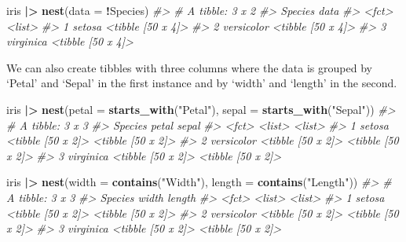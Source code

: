 \documentclass[
]{book}
\newenvironment{Shaded}{\begin{snugshade}}{\end{snugshade}}
\newcommand{\AttributeTok}[1]{\textcolor[rgb]{0.13,0.29,0.53}{#1}}
\newcommand{\CommentTok}[1]{\textcolor[rgb]{0.56,0.35,0.01}{\textit{#1}}}
\newcommand{\FunctionTok}[1]{\textcolor[rgb]{0.13,0.29,0.53}{\textbf{#1}}}
\newcommand{\NormalTok}[1]{#1}
\newcommand{\SpecialCharTok}[1]{\textcolor[rgb]{0.81,0.36,0.00}{\textbf{#1}}}
\newcommand{\StringTok}[1]{\textcolor[rgb]{0.31,0.60,0.02}{#1}}
\begin{document}
\begin{Shaded}
\begin{Highlighting}[]
\NormalTok{iris }\SpecialCharTok{|\textgreater{}} \FunctionTok{nest}\NormalTok{(}\AttributeTok{data =} \SpecialCharTok{!}\NormalTok{Species)}
\CommentTok{\#\textgreater{} \# A tibble: 3 x 2}
\CommentTok{\#\textgreater{}   Species    data             }
\CommentTok{\#\textgreater{}   \textless{}fct\textgreater{}      \textless{}list\textgreater{}           }
\CommentTok{\#\textgreater{} 1 setosa     \textless{}tibble [50 x 4]\textgreater{}}
\CommentTok{\#\textgreater{} 2 versicolor \textless{}tibble [50 x 4]\textgreater{}}
\CommentTok{\#\textgreater{} 3 virginica  \textless{}tibble [50 x 4]\textgreater{}}
\end{Highlighting}
\end{Shaded}

We can also create tibbles with three columns where the data is grouped by `Petal' and `Sepal' in the first instance and by `width' and `length' in the second.

\begin{Shaded}
\begin{Highlighting}[]
\NormalTok{iris }\SpecialCharTok{|\textgreater{}} \FunctionTok{nest}\NormalTok{(}\AttributeTok{petal =} \FunctionTok{starts\_with}\NormalTok{(}\StringTok{"Petal"}\NormalTok{), }\AttributeTok{sepal =} \FunctionTok{starts\_with}\NormalTok{(}\StringTok{"Sepal"}\NormalTok{))}
\CommentTok{\#\textgreater{} \# A tibble: 3 x 3}
\CommentTok{\#\textgreater{}   Species    petal             sepal            }
\CommentTok{\#\textgreater{}   \textless{}fct\textgreater{}      \textless{}list\textgreater{}            \textless{}list\textgreater{}           }
\CommentTok{\#\textgreater{} 1 setosa     \textless{}tibble [50 x 2]\textgreater{} \textless{}tibble [50 x 2]\textgreater{}}
\CommentTok{\#\textgreater{} 2 versicolor \textless{}tibble [50 x 2]\textgreater{} \textless{}tibble [50 x 2]\textgreater{}}
\CommentTok{\#\textgreater{} 3 virginica  \textless{}tibble [50 x 2]\textgreater{} \textless{}tibble [50 x 2]\textgreater{}}

\NormalTok{iris }\SpecialCharTok{|\textgreater{}} \FunctionTok{nest}\NormalTok{(}\AttributeTok{width =} \FunctionTok{contains}\NormalTok{(}\StringTok{"Width"}\NormalTok{), }\AttributeTok{length =} \FunctionTok{contains}\NormalTok{(}\StringTok{"Length"}\NormalTok{))}
\CommentTok{\#\textgreater{} \# A tibble: 3 x 3}
\CommentTok{\#\textgreater{}   Species    width             length           }
\CommentTok{\#\textgreater{}   \textless{}fct\textgreater{}      \textless{}list\textgreater{}            \textless{}list\textgreater{}           }
\CommentTok{\#\textgreater{} 1 setosa     \textless{}tibble [50 x 2]\textgreater{} \textless{}tibble [50 x 2]\textgreater{}}
\CommentTok{\#\textgreater{} 2 versicolor \textless{}tibble [50 x 2]\textgreater{} \textless{}tibble [50 x 2]\textgreater{}}
\CommentTok{\#\textgreater{} 3 virginica  \textless{}tibble [50 x 2]\textgreater{} \textless{}tibble [50 x 2]\textgreater{}}
\end{Highlighting}
\end{Shaded}
\end{document}
